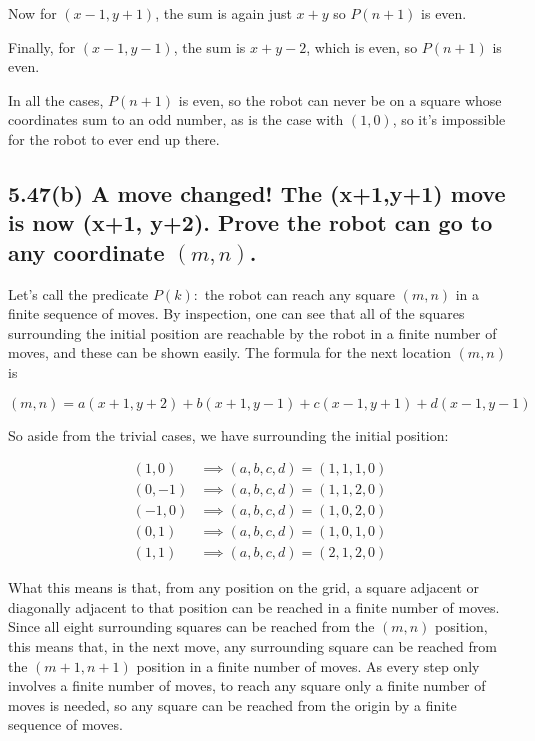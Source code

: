 \documentclass{article}
\begin{document}
Now for $(x-1, y+1)$, the sum is again just $x+y$ so $P(n+1)$ is even.

Finally, for $(x-1,y-1)$, the sum is $x+y-2$, which is even, so $P(n+1)$ is even.

In all the cases, $P(n+1)$ is even, so the robot can never be on a square whose coordinates sum to an odd number, as is the case with $(1,0)$, so it's impossible for the robot to ever end up there.

\subsection*{5.47(b) \normalsize A move changed! The (x+1,y+1) move is now (x+1, y+2). Prove the robot can go to any coordinate $(m,n)$.}

Let's call the predicate $P(k): $ the robot can reach any square $(m,n)$ in a finite sequence of moves. By inspection, one can see that all of the squares surrounding the initial position are reachable by the robot in a finite number of moves, and these can be shown easily. The formula for the next location $(m,n)$ is 

$$(m,n) = a(x+1,y+2) + b(x+1, y-1) + c(x-1, y+1) + d(x-1,y-1)$$

So aside from the trivial cases, we have surrounding the initial position:

\begin{align*}
  (1,0) &\implies (a,b,c,d) = (1,1,1,0) \\
  (0,-1) &\implies (a,b,c,d) = (1,1,2,0) \\
  (-1,0) &\implies (a,b,c,d) = (1,0,2,0) \\
  (0,1) &\implies (a,b,c,d) = (1,0,1,0) \\
  (1,1) &\implies (a,b,c,d) = (2,1,2,0) 
\end{align*}

What this means is that, from any position on the grid, a square adjacent or diagonally adjacent to that position can be reached in a finite number of moves. Since all eight surrounding squares can be reached from the $(m,n)$ position, this means that, in the next move, any surrounding square can be reached from the $(m+1, n+1)$ position in a finite number of moves. As every step only involves a finite number of moves, to reach any square only a finite number of moves is needed, so any square can be reached from the origin by a finite sequence of moves.
\end{document}
